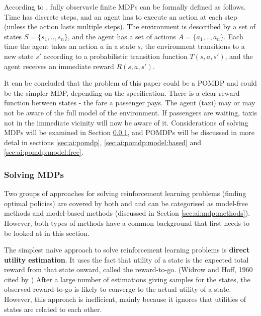 According to \textcite{Spaan2012ai+pomdp}, fully observavle finite MDPs can be
formally defined as follows. Time has discrete steps, and an agent has to
execute an action at each step (unless the action lasts multiple steps). The
environment is desccribed by a set of states \(S = \{s_1,..,s_n\}\), and the
agent has a set of actions \(A = \{a_1,..,a_n\}\). Each time the agent takes an
action \(a\) in a state \(s\), the environment transitions to a new state
\(s'\) according to a probabilistic transition function \(T(s,a,s')\), and the
agent receives an immediate reward \(R(s,a,s')\).

It can be concluded that the problem of this paper could be a POMDP and could
be the simpler MDP, depending on the specification. There is a clear reward
function between states - the fare a passenger pays. The agent (taxi) may or
may not be aware of the full model of the environment. If passengers are
waiting, taxis not in the immediate vicinity will now be aware of it.
Considerations of solving MDPs will be examined in Section
\ref{sec:ai:mdp:solving}, and POMDPs will be discussed in more detal in
sections \ref{sec:ai:pomdp}, \ref{sec:ai:pomdp:model:based} and
\ref{sec:ai:pomdp:model:free}.


\subsubsection{Solving MDPs}
\label{sec:ai:mdp:solving}

Two groups of approaches for solving reinforcement learning problems (finding
optimal policies) are covered by both \textcite{Russell2010ai+modern} and
\textcite{Sutton1998ai+reinforcement} and can be categorised as model-free
methods and model-based methods (discussed in Section
\ref{sec:ai:mdp:methods}). However, both types of methods have a
common background that first needs to be looked at in this section.

The simplest naive approach to solve reinforcement learning problems is
\textbf{direct utility estimation}. It uses the fact that utility of a state is
the expected total reward from that state onward, called the reward-to-go.
(Widrow and Hoff, 1960 cited by \textcite{Russell2010ai+modern}) After a large
number of estimations giving samples for the states, the observed reward-to-go
is likely to converge to the actual utility of a state. However, this approach
is inefficient, mainly because it ignores that utilities of states are related
to each other. \parencite{Russell2010ai+modern}

